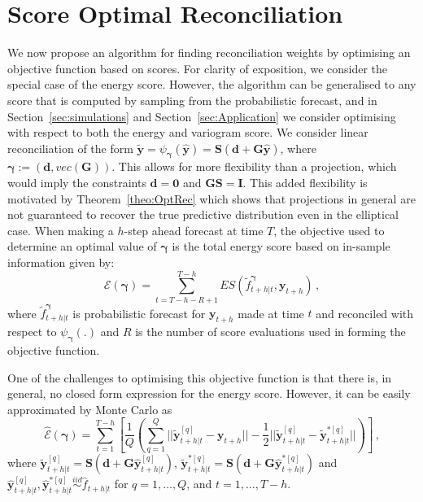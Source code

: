 \documentclass[12pt]{article}
\theoremstyle{definition}
\begin{document}
\section{Score Optimal Reconciliation}\label{sec:scoreoptSGD}

We now propose an algorithm for finding reconciliation weights by optimising an objective function based on scores.  For clarity of exposition, we consider the special case of the energy score. However, the algorithm can be generalised to any score that is computed by sampling from the probabilistic forecast, and in Section~\ref{sec:simulations} and Section~\ref{sec:Application} we consider optimising with respect to both the energy and variogram score.  We consider linear reconciliation of the form $\tilde{\bm{y}}=\psi_{\bm{\gamma}}({\bm{\hat{y}}})={\bm{S}}\left(\bm{d}+\bm{G}{\bm{\hat{y}}}\right)$, where ${\bm\gamma}:=\left(\bm{d},vec(\bm{G})\right)$. This allows for more flexibility than a projection, which would imply the constraints $\bm{d}=\bm{0}$ and $\bm{G}\bm{S}=\bm{I}$.  This added flexibility is motivated by Theorem~\ref{theo:OptRec} which shows that projections in general are not guaranteed to recover the true predictive distribution even in the elliptical case. When making a $h$-step ahead forecast at time $T$, the objective used to determine an optimal value of $\bm{\gamma}$ is the total energy score based on in-sample information given by:
\begin{equation}
\mathcal{E}\left(\bm{\gamma}\right)=\sum\limits_{t=T-h-R+1}^{T-h} \textit{ES}(\tilde{f}^{\bm{\gamma}}_{t+h|t},\bm{y}_{t+h})\,,
\label{eq:tes}
\end{equation} 
where $\tilde{f}^{\bm{\bm{\gamma}}}_{t+h|t}$ is probabilistic forecast for $\bm{y}_{t+h}$ made at time $t$ and reconciled with respect to $\psi_{\bm{\gamma}}(.)$ and $R$ is the number of score evaluations used in forming the objective function.  

One of the challenges to optimising this objective function is that there is, in general, no closed form expression for the energy score.  However, it can be easily approximated by Monte Carlo as
\begin{equation}
\hat{\mathcal{E}}\left(\bm{\gamma}\right)=\sum\limits_{t=1}^{T-h}\left[\frac{1}{Q}\left(\sum\limits_{q=1}^{Q}||\tilde{\bm{y}}^{[q]}_{t+h|t}-\bm{y}_{t+h}||-\frac{1}{2}||\tilde{\bm{y}}_{t+h|t}^{[q]}-\tilde{\bm{y}}^{*[q]}_{t+h|t}||\right)\right]\,,
\label{eq:obj_mc}
\end{equation} 
where $\tilde{\bm{y}}^{[q]}_{t+h|t}=\bm{S}\left(\bm{d}+\bm{G}{\hat{\bm{y}}}^{[q]}_{t+h|t}\right)$, $\tilde{\bm{y}}^{*[q]}_{t+h|t}=\bm{S}\left(\bm{d}+\bm{G}{\hat{\bm{y}}}^{*[q]}_{t+h|t}\right)$ and ${\hat{\bm{y}}}^{[q]}_{t+h|t},{\hat{\bm{y}}}^{*[q]}_{t+h|t}\overset{iid}{\sim} \hat{f}_{t+h|t}$ for $q=1,\ldots,Q$, and $t=1,\ldots,T-h$.  
\end{document}
